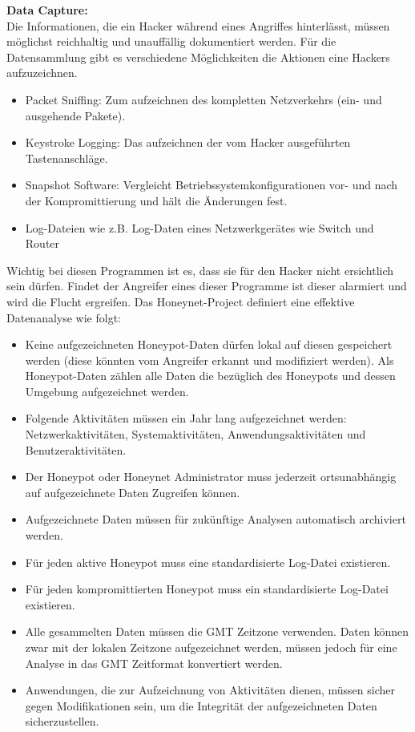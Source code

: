 \noindent\textbf{Data Capture: }\\
\noindent Die Informationen, die ein Hacker während eines Angriffes hinterlässt, müssen möglichst reichhaltig und unauffällig dokumentiert werden. Für die Datensammlung gibt es verschiedene Möglichkeiten die Aktionen eine Hackers aufzuzeichnen\cite{grimes.2003a}.
\begin{itemize}
\item Packet Sniffing: Zum aufzeichnen des kompletten Netzverkehrs (ein- und ausgehende Pakete).
\item Keystroke Logging: Das aufzeichnen der vom Hacker ausgeführten Tastenanschläge.
\item Snapshot Software: Vergleicht Betriebssystemkonfigurationen vor- und nach der Kompromittierung und hält die Änderungen fest.
\item Log-Dateien wie z.B. Log-Daten eines Netzwerkgerätes wie Switch und Router
\end{itemize} 
Wichtig bei diesen Programmen ist es, dass sie für den Hacker nicht ersichtlich sein dürfen. Findet der Angreifer eines dieser Programme ist dieser alarmiert und wird die Flucht ergreifen\cite{spitzner.2002a}.
Das Honeynet-Project definiert eine effektive Datenanalyse wie folgt:\cite{spitzner.2002a}
\begin{itemize}
\item Keine aufgezeichneten Honeypot-Daten dürfen lokal auf diesen gespeichert werden (diese könnten vom Angreifer erkannt und modifiziert werden). Als Honeypot-Daten zählen alle Daten die bezüglich des Honeypots und dessen Umgebung aufgezeichnet werden.
\item Folgende Aktivitäten müssen ein Jahr lang aufgezeichnet werden: Netzwerkaktivitäten, Systemaktivitäten, Anwendungsaktivitäten und Benutzeraktivitäten.
\item Der Honeypot oder Honeynet Administrator muss jederzeit ortsunabhängig auf aufgezeichnete Daten Zugreifen können.
\item Aufgezeichnete Daten müssen für zukünftige Analysen automatisch archiviert werden.
\item Für jeden aktive Honeypot muss eine standardisierte Log-Datei existieren.
\item Für jeden kompromittierten Honeypot muss ein standardisierte Log-Datei existieren.
\item Alle gesammelten Daten müssen die GMT Zeitzone verwenden. Daten können zwar mit der lokalen Zeitzone aufgezeichnet werden, müssen jedoch für eine Analyse in das GMT Zeitformat konvertiert werden.
\item Anwendungen, die zur Aufzeichnung von Aktivitäten dienen, müssen sicher gegen Modifikationen sein, um die Integrität der aufgezeichneten Daten sicherzustellen.
\end{itemize}

